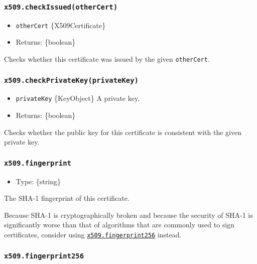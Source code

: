 \subsubsection{\texorpdfstring{\texttt{x509.checkIssued(otherCert)}}{x509.checkIssued(otherCert)}}\label{x509.checkissuedothercert}

\begin{itemize}
\tightlist
\item
  \texttt{otherCert} \{X509Certificate\}
\item
  Returns: \{boolean\}
\end{itemize}

Checks whether this certificate was issued by the given
\texttt{otherCert}.

\subsubsection{\texorpdfstring{\texttt{x509.checkPrivateKey(privateKey)}}{x509.checkPrivateKey(privateKey)}}\label{x509.checkprivatekeyprivatekey}

\begin{itemize}
\tightlist
\item
  \texttt{privateKey} \{KeyObject\} A private key.
\item
  Returns: \{boolean\}
\end{itemize}

Checks whether the public key for this certificate is consistent with
the given private key.

\subsubsection{\texorpdfstring{\texttt{x509.fingerprint}}{x509.fingerprint}}\label{x509.fingerprint}

\begin{itemize}
\tightlist
\item
  Type: \{string\}
\end{itemize}

The SHA-1 fingerprint of this certificate.

Because SHA-1 is cryptographically broken and because the security of
SHA-1 is significantly worse than that of algorithms that are commonly
used to sign certificates, consider using
\hyperref[x509fingerprint256]{\texttt{x509.fingerprint256}} instead.

\subsubsection{\texorpdfstring{\texttt{x509.fingerprint256}}{x509.fingerprint256}}\label{x509.fingerprint256}

